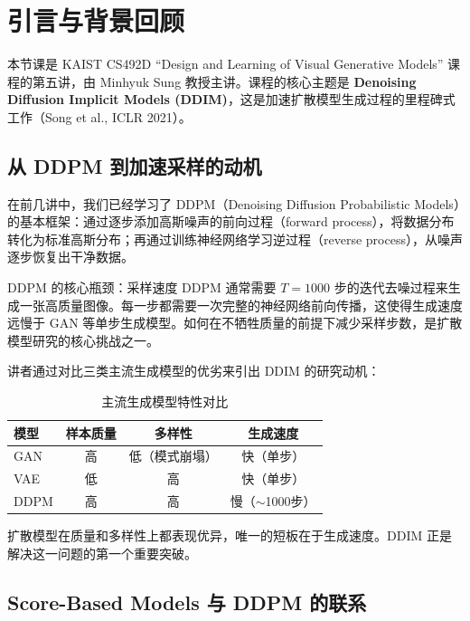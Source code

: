 \section{引言与背景回顾}

本节课是 KAIST CS492D ``Design and Learning of Visual Generative Models'' 课程的第五讲，由 Minhyuk Sung 教授主讲。课程的核心主题是 \textbf{Denoising Diffusion Implicit Models (DDIM)}，这是加速扩散模型生成过程的里程碑式工作（Song et al., ICLR 2021）。

\subsection{从 DDPM 到加速采样的动机}

在前几讲中，我们已经学习了 DDPM（Denoising Diffusion Probabilistic Models）的基本框架：通过逐步添加高斯噪声的前向过程（forward process），将数据分布转化为标准高斯分布；再通过训练神经网络学习逆过程（reverse process），从噪声逐步恢复出干净数据。

\begin{importantbox}{DDPM 的核心瓶颈：采样速度}
DDPM 通常需要 $T=1000$ 步的迭代去噪过程来生成一张高质量图像。每一步都需要一次完整的神经网络前向传播，这使得生成速度远慢于 GAN 等单步生成模型。如何在不牺牲质量的前提下减少采样步数，是扩散模型研究的核心挑战之一。
\end{importantbox}

讲者通过对比三类主流生成模型的优劣来引出 DDIM 的研究动机：

\begin{table}[H]
\centering
\caption{主流生成模型特性对比}
\begin{tabular}{lccc}
\toprule
\textbf{模型} & \textbf{样本质量} & \textbf{多样性} & \textbf{生成速度} \\
\midrule
GAN & 高 & 低（模式崩塌） & 快（单步） \\
VAE & 低 & 高 & 快（单步） \\
DDPM & 高 & 高 & 慢（$\sim$1000步） \\
\bottomrule
\end{tabular}
\end{table}

扩散模型在质量和多样性上都表现优异，唯一的短板在于生成速度。DDIM 正是解决这一问题的第一个重要突破。

\subsection{Score-Based Models 与 DDPM 的联系}

